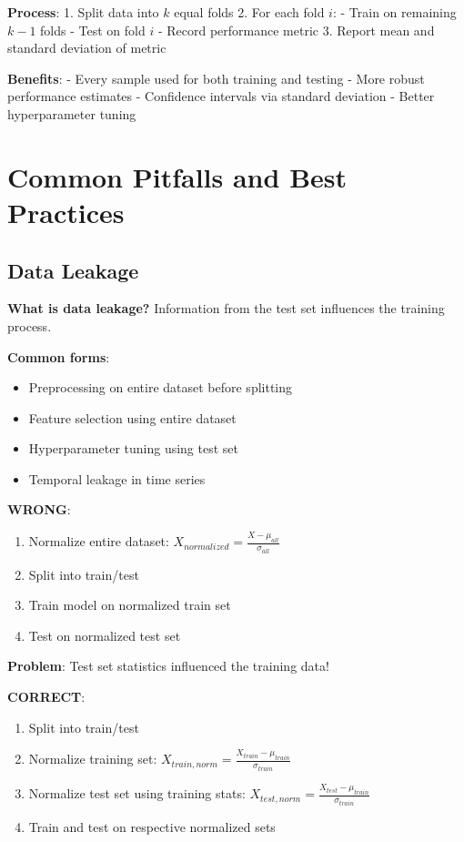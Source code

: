 \documentclass{article}
\newcounter{example}
\begin{document}
\textbf{Process}:
1. Split data into $k$ equal folds
2. For each fold $i$:
   - Train on remaining $k-1$ folds
   - Test on fold $i$
   - Record performance metric
3. Report mean and standard deviation of metric

\textbf{Benefits}:
- Every sample used for both training and testing
- More robust performance estimates
- Confidence intervals via standard deviation
- Better hyperparameter tuning

\section{Common Pitfalls and Best Practices}

\subsection{Data Leakage}

\textbf{What is data leakage?} Information from the test set influences the training process.

\textbf{Common forms}:
\begin{itemize}
    \item Preprocessing on entire dataset before splitting
    \item Feature selection using entire dataset
    \item Hyperparameter tuning using test set
    \item Temporal leakage in time series
\end{itemize}

\begin{tcolorbox}[colback=red!5!white,colframe=red!75!black,title=Example \stepcounter{example}\#\theexample: Preprocessing Data Leakage]
\textbf{WRONG}: 
\begin{enumerate}
    \item Normalize entire dataset: $X_{normalized} = \frac{X - \mu_{all}}{\sigma_{all}}$
    \item Split into train/test
    \item Train model on normalized train set
    \item Test on normalized test set
\end{enumerate}

\textbf{Problem}: Test set statistics influenced the training data!

\textbf{CORRECT}:
\begin{enumerate}
    \item Split into train/test
    \item Normalize training set: $X_{train,norm} = \frac{X_{train} - \mu_{train}}{\sigma_{train}}$
    \item Normalize test set using training stats: $X_{test,norm} = \frac{X_{test} - \mu_{train}}{\sigma_{train}}$
    \item Train and test on respective normalized sets
\end{enumerate}
\end{tcolorbox}
\end{document}
